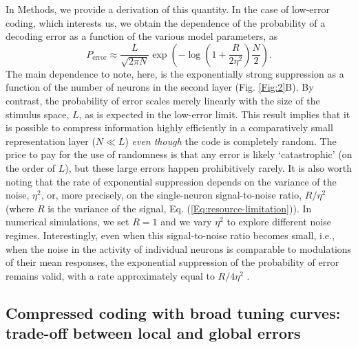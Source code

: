 \documentclass[a4paper]{article}%
\begin{document}
In Methods, we provide a derivation of this quantity. In the case of low-error
coding, which interests us, we obtain the dependence of the probability of a
decoding error as a function of the various model parameters, as
\begin{equation}
P_{\text{error}}\approx\frac{L}{\sqrt{2\pi N}}\exp\left(  -{\log}\left(
{1+\frac{R}{2\eta^{2}}}\right)  {\frac{N}{2}}\right)  . \label{Eq:PGE}%
\end{equation}
The main dependence to note, here, is the exponentially strong suppression as
a function of the number of neurons in the second layer (Fig. \ref{Fig:2}B).
By contrast, the probability of error scales merely linearly with the size of
the stimulus space, $L$, as is expected in the low-error limit. This result
implies that it is possible to compress information highly efficiently in a
comparatively small representation layer ($N\ll L$) \textit{even though} the
code is completely random. The price to pay for the use of randomness is that
any error is likely `catastrophic' (on the order of $L$), but these large
errors happen prohibitively rarely. It is also worth noting that the rate of
exponential suppression depends on the variance of the noise, $\eta^{2}$, or,
more precisely, on the single-neuron signal-to-noise ratio, $R/\eta^{2}$
(where $R$ is the variance of the signal, Eq. (\ref{Eq:resource-limitation})).
In numerical simulations, we set $R=1$ and we vary $\eta^{2}$ to explore
different noise regimes. Interestingly, even when this signal-to-noise ratio
becomes small, i.e., when the noise in the activity of individual neurons is
comparable to modulations of their mean responses, the exponential suppression
of the probability of error remains valid, with a rate approximately equal to
$R/4\eta^{2}$ .


\subsection*{Compressed coding with broad tuning curves: trade-off between
local and global errors}
\end{document}
